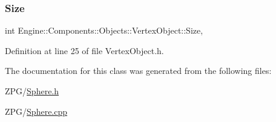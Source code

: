 \mbox{\label{classEngine_1_1Components_1_1Objects_1_1VertexObject_a13ec6e4a92520bdd1b33ad6de757cb92}} 
\subsubsection{\texorpdfstring{Size}{Size}}
{\footnotesize\ttfamily int Engine\+::\+Components\+::\+Objects\+::\+Vertex\+Object\+::\+Size\hspace{0.3cm}{\ttfamily [protected]}, {\ttfamily [inherited]}}



Definition at line 25 of file Vertex\+Object.\+h.



The documentation for this class was generated from the following files\+:\begin{DoxyCompactItemize}
\item 
Z\+P\+G/\mbox{\hyperlink{Sphere_8h}{Sphere.\+h}}\item 
Z\+P\+G/\mbox{\hyperlink{Sphere_8cpp}{Sphere.\+cpp}}\end{DoxyCompactItemize}
